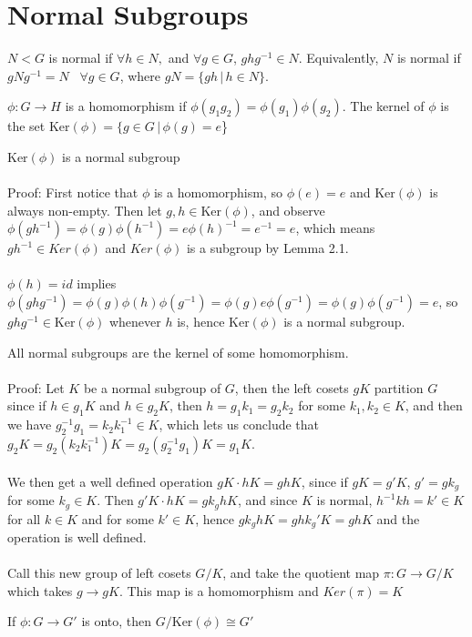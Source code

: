 \documentclass{amsart}
\begin{document}
\section{\textbf{Normal Subgroups}}
\hfill
\begin{definition}
    $N<G$ is normal if $\forall h\in N,$ and $\forall g\in G$, $ghg^{-1}\in N$. Equivalently, $N$ is normal if $gNg^{-1}=N \hspace{10pt} \forall g\in G$, where $gN = \{gh \hspace{2pt}| \hspace{2pt}h\in N\}.$ 
\end{definition}
\hfill
\begin{definition}
    $\phi : G\to H$ is a homomorphism if $\phi(g_1g_2)=\phi(g_1)\phi(g_2)$. The kernel of $\phi$ is the set $\text{Ker}(\phi)=\{g\in G \hspace{2pt} | \hspace{2pt} \phi(g)=e$\} 
\end{definition}
\hfill
\begin{lemma}
    $\text{Ker}(\phi)$ is a normal subgroup\\
    \\
    Proof: First notice that $\phi$ is a homomorphism, so $\phi(e)=e$ and $\text{Ker}(\phi)$ is always non-empty. Then let $g,h\in \text{Ker}(\phi)$, and observe $\phi(gh^{-1})=\phi(g)\phi(h^{-1})=e\phi(h)^{-1}=e^{-1}=e$, which means $gh^{-1}\in Ker(\phi)$ and $Ker(\phi)$ is a subgroup by Lemma 2.1.\\
    \\
    $\phi(h)=id$ implies $\phi(ghg^{-1})=\phi(g)\phi(h)\phi(g^{-1})=\phi(g)e\phi(g^{-1})=\phi(g)\phi(g^{-1})=e$, so $ghg^{-1}\in\text{Ker}(\phi)$ whenever $h$ is, hence $\text{Ker}(\phi)$ is a normal subgroup.
\end{lemma}
\hfill
\begin{theorem}
    All normal subgroups are the kernel of some homomorphism.\\
    \\
    Proof: Let $K$ be a normal subgroup of $G$, then the left cosets $gK$ partition $G$ since if $h\in g_1K$ and $h\in g_2K$, then $h=g_1k_1 = g_2k_2$ for some $k_1,k_2\in K$, and then we have $g_2^{-1}g_1=k_2k_1^{-1}\in K$, which lets us conclude that $g_2K = g_2(k_2k_1^{-1})K=g_2(g_2^{-1}g_1)K=g_1K$. \\
    \\
    We then get a well defined operation $gK\cdot hK = ghK$, since if $gK=g'K$, $g'=gk_g$ for some $k_g\in K$. Then $g'K\cdot hK = gk_ghK$, and since $K$ is normal, $h^{-1}kh=k'\in K$ for all $k\in K$ and for some $k'\in K$, hence $gk_ghK=ghk_g'K=ghK$ and the operation is well defined.\\
    \\
    Call this new group of left cosets $G/K$, and take the quotient map $\pi:G\to G/K$ which takes $g\to gK$. This map is a homomorphism and $Ker(\pi)=K$
\end{theorem}
\hfill
\begin{corollary}
    If $\phi : G\to G'$ is onto, then $G/\text{Ker}(\phi)\cong G'$
\end{corollary}
\hfill
\end{document}
